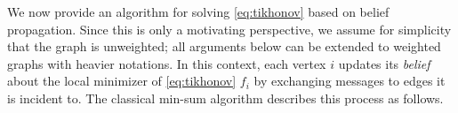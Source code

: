 \documentclass[letterpaper]{article} %
\begin{document}
We now provide an algorithm for solving \eqref{eq:tikhonov} based on belief propagation. Since this is only a motivating perspective, we assume for simplicity that the graph is unweighted; all arguments below can be extended to weighted graphs with heavier notations. In this context, each vertex $i$ updates its \textit{belief} about the local minimizer of \eqref{eq:tikhonov} $f_i$ by exchanging messages to edges it is incident to. The classical min-sum algorithm \cite{min_Sum} describes this process as follows. 
\end{document}
